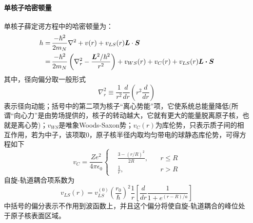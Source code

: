 \paragraph*{单核子哈密顿量}
单核子薛定谔方程中的哈密顿量为：
\begin{equation}
	\begin{aligned}
		h =&\, \frac{-\hbar^2}{2 m_{N}} \nabla^2 + v(r) + v_{LS}(r) \bm{L}\cdot \bm{S}	\\
		=&\, \frac{-\hbar^2}{2 m_{N}}\left(\nabla^2_{r} - \frac{\bm{L}^2/\hbar^2}{r^2}\right) + v_{WS}(r) + v_{C}(r) + v_{LS}(r)\boldsymbol{L\cdot S}
	\end{aligned}
\end{equation} 
其中，径向偏分取一般形式
\begin{equation}
	\nabla^2_{r} \equiv \frac{1}{r^2} \frac{d}{dr} \left(r^2 \frac{d}{dr}\right)
\end{equation}
表示径向动能；括号中的第二项为核子“离心势能”项，它使系统总能量降低(所谓“向心力”是由势场提供的，核子的转动越大，它就有更大的能量脱离原子核，也就是离心势)；$v_{WS}$是唯象Woods-Saxon势；$v_{C}(r)$为库伦势，只表示质子间的相互作用，若为中子，该项取0，原子核半径内取均匀带电的球静态库伦势，可得方程如下
\begin{equation}
	v_{C} = \frac{Ze^2}{4\pi\epsilon_0} \left\{
		\begin{aligned}
			&\frac{3 - (r/R)^2}{2R}, \quad & r\leqslant  R \\
			&\frac{1}{r}, \quad            & r > R  
		\end{aligned}
	\right.
\end{equation}
自旋-轨道耦合项系数为
\begin{equation}
	v_{LS}(r) = v_{LS}^{(0)} \left(\frac{r_0}{\hbar}\right)^2 \frac{1}{r} \left[\frac{d}{dr} \frac{1}{1 + e^{(r-R)/a}}\right]
	\label{eq:spin-orbit-der-term}
\end{equation}
中括号的偏分表示不作用到波函数上，并且这个偏分将使自旋-轨道耦合的峰位处于原子核表面区域。
